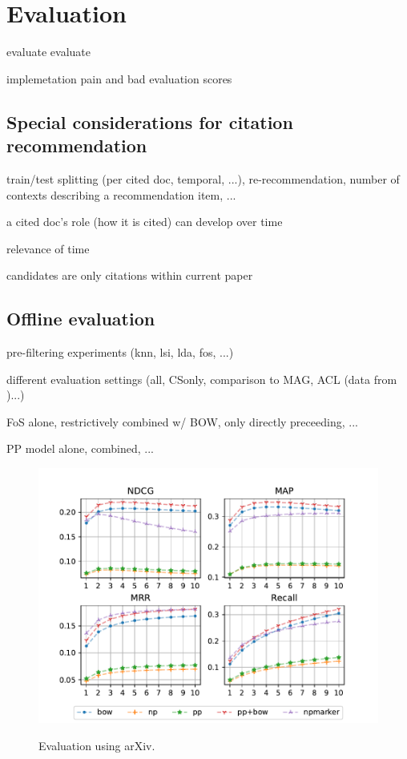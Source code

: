 \chapter{Evaluation}\label{chap:evaluation}
evaluate evaluate

implemetation pain and bad evaluation scores\cite{Beel2017}

\section{Special considerations for citation recommendation}
train/test splitting (per cited doc, temporal, ...), re-recommendation, number of contexts describing a recommendation item, ...

a cited doc's role (how it is cited) can develop over time\cite{Swales1986,He2018}

relevance of time\cite{Beel2017a}

candidates are only citations within current paper\cite{Duma2014}

\section{Offline evaluation}
pre-filtering experiments (knn\cite{Bhagavatula2018}, lsi, lda, fos, ...)

different evaluation settings (all, CSonly, comparison to MAG, ACL (data from \cite{Faerber2018b})...)

FoS alone, restrictively combined w/ BOW, only directly preceeding, ...

PP model alone, combined, ...



\begin{figure}
  \centering
    \includegraphics[width=.9\textwidth]{figures/evaluation/arXiv_CS_select.pdf}
  \label{fig:evalarxiv}
  \caption{Evaluation using arXiv.}
\end{figure}

